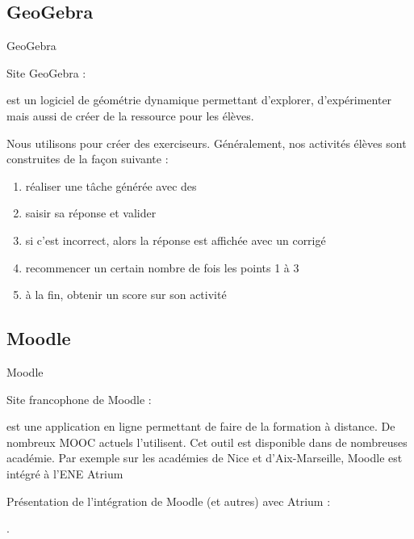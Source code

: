 \documentclass[letterpaper,10pt,french]{sphinxmanual}
\begin{document}
\subsection{GeoGebra}
\label{\detokenize{projet-description:geogebra}}
GeoGebra %
\begin{footnote}[2]\sphinxAtStartFootnote
Site GeoGebra : 
%
\end{footnote} est un logiciel de géométrie dynamique permettant d’explorer,
d’expérimenter mais aussi de créer de la ressource pour les élèves.

Nous utilisons  pour créer des exerciseurs. Généralement, nos activités
élèves sont construites de la façon suivante :
\begin{enumerate}
\item {} 
réaliser une tâche générée avec des 

\item {} 
saisir sa réponse et valider

\item {} 
si c’est incorrect, alors la réponse est affichée avec un corrigé

\item {} 
recommencer un certain nombre de fois les points 1 à 3

\item {} 
à la fin, obtenir un score sur son activité

\end{enumerate}



\subsection{Moodle}
\label{\detokenize{projet-description:moodle}}
Moodle %
\begin{footnote}[3]\sphinxAtStartFootnote
Site francophone de Moodle : 
%
\end{footnote} est une application en ligne permettant de faire de la formation à
distance. De nombreux MOOC actuels l’utilisent. Cet outil est disponible dans de
nombreuses académie. Par exemple sur les académies de Nice et d’Aix-Marseille, Moodle
est intégré à l’ENE Atrium %
\begin{footnote}[4]\sphinxAtStartFootnote
Présentation de l’intégration de Moodle (et autres) avec
Atrium : 
%
\end{footnote}.
\end{document}
